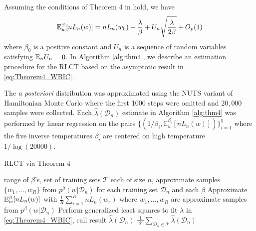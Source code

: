 \documentclass{article} %
\begin{document}
Assuming the conditions of Theorem 4 in \cite{watanabe_widely_2013} hold, we have
\begin{equation}
    {\mathbb{E}}_w^\beta [nL_n(w)] = nL_n(w_0) + \frac{\lambda }{\beta} + U_n \sqrt{\frac{\lambda}{2 \beta}} + O_p(1)
    \label{eq:Theorem4_WBIC}
\end{equation}
where $\beta_0$ is a positive constant and $U_n$ is a sequence of random variables satisfying ${\mathbb{E}}_n U_n = 0$. %
In Algorithm \ref{alg:thm4}, we describe an estimation procedure for the RLCT based on the asymptotic result in \eqref{eq:Theorem4_WBIC}.

The \emph{a posteriori} distribution was approximated using the NUTS variant of Hamiltonian Monte Carlo \citep{hoffman2014no} where the first 1000 steps were omitted and $20,000$ samples were collected.  Each $\hat \lambda(\mathcal D_n)$ estimate in Algorithm \ref{alg:thm4} was performed by linear regression on the pairs $\{ (1/\beta_i, \mathbb{E}^{\beta_i}_w[ nL_n(w) ] ) \}_{i=1}^5$ where the five inverse temperatures $\beta_i$ are centered on high temperature $1/\log(20000)$.

\begin{algorithm}[tb]
	\caption{RLCT via Theorem 4}
	\label{alg:thm4}
	\begin{algorithmic}
		 range of $\beta$'s, set of training sets $\mathcal T$ each of size $n$, approximate samples $\{w_1,\ldots,w_R\}$ from $p^\beta(w|\mathcal D_n)$ for each training set $\mathcal D_n$ and each $\beta$
        		\STATE Approximate ${\mathbb{E}}_w^\beta [nL_n(w)]$ with $\frac{1}{R} \sum_{i=1}^R nL_n(w_r)$ where $w_1,\ldots,w_R$ are approximate samples from $p^\beta(w|\mathcal D_n)$
    		\ENDFOR
    		\STATE Perform generalized least squares to fit $\lambda$ in \eqref{eq:Theorem4_WBIC}, call result $\hat \lambda(\mathcal D_n)$
		\ENDFOR
		 $\frac{1}{|\mathcal T|} \sum_{\mathcal D_n \in \mathcal T} \hat \lambda(\mathcal D_n)$
	\end{algorithmic}
\end{algorithm}
\end{document}

